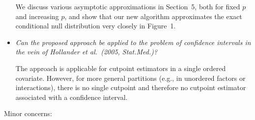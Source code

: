 \documentclass[11pt,a4paper]{article}
\begin{document}
\begin{itemize}
	We discuss various asymptotic approximations in Section~5, both for fixed $p$
	and increasing $p$, and show that our new algorithm approximates the exact
	conditional null distribution very closely in Figure~1.
	
  \item \textit{Can the proposed approach be applied to the problem of confidence
        intervals in the vein of Hollander et al.\ (2005, Stat.Med.)?}
	
	The approach is applicable for cutpoint estimators in a single ordered
        covariate. However, for more general partitions (e.g., in unordered factors
	or interactions), there is no single cutpoint and therefore no cutpoint
	estimator associated with a confidence interval.
	
\end{itemize}

Minor concerns:
\end{document}
